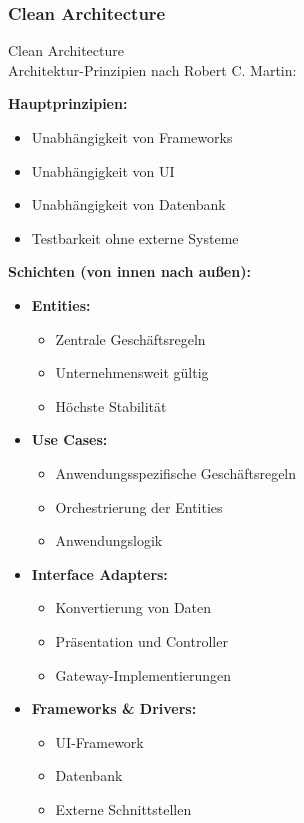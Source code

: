 \subsubsection{Clean Architecture}

\begin{concept}{Clean Architecture}\\
Architektur-Prinzipien nach Robert C. Martin:

\textbf{Hauptprinzipien:}
\begin{itemize}
    \item Unabhängigkeit von Frameworks
    \item Unabhängigkeit von UI
    \item Unabhängigkeit von Datenbank
    \item Testbarkeit ohne externe Systeme
\end{itemize}

\textbf{Schichten (von innen nach außen):}
\begin{itemize}
    \item \textbf{Entities:} 
    \begin{itemize}
        \item Zentrale Geschäftsregeln
        \item Unternehmensweit gültig
        \item Höchste Stabilität
    \end{itemize}
    
    \item \textbf{Use Cases:}
    \begin{itemize}
        \item Anwendungsspezifische Geschäftsregeln
        \item Orchestrierung der Entities
        \item Anwendungslogik
    \end{itemize}
    
    \item \textbf{Interface Adapters:}
    \begin{itemize}
        \item Konvertierung von Daten
        \item Präsentation und Controller
        \item Gateway-Implementierungen
    \end{itemize}
    
    \item \textbf{Frameworks \& Drivers:}
    \begin{itemize}
        \item UI-Framework
        \item Datenbank
        \item Externe Schnittstellen
    \end{itemize}
\end{itemize}
\end{concept}

